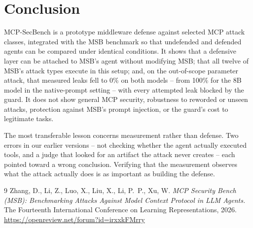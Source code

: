 \documentclass[11pt]{article}
\begin{document}
\section{Conclusion}

MCP-SecBench is a prototype middleware defense against selected MCP attack
classes, integrated with the MSB benchmark so that undefended and defended
agents can be compared under identical conditions. It shows that a defensive
layer can be attached to MSB's agent without modifying MSB; that all twelve
of MSB's attack types execute in this setup; and, on the out-of-scope
parameter attack, that measured leaks fell to 0\% on both models -- from
100\% for the 8B model in the native-prompt setting -- with every attempted
leak blocked by the guard. It does not show general MCP security, robustness to
reworded or unseen attacks, protection against MSB's prompt injection, or the
guard's cost to legitimate tasks.

The most transferable lesson concerns measurement rather than defense. Two
errors in our earlier versions -- not checking whether the agent actually
executed tools, and a judge that looked for an artifact the attack never
creates -- each pointed toward a wrong conclusion. Verifying that the
measurement observes what the attack actually does is as important as
building the defense.

\begin{thebibliography}{9}
Zhang, D., Li, Z., Luo, X., Liu, X., Li, P.\ P., Xu, W.
\emph{MCP Security Bench (MSB): Benchmarking Attacks Against Model Context
Protocol in LLM Agents.} The Fourteenth International Conference on Learning
Representations, 2026. \url{https://openreview.net/forum?id=irxxkFMrry}
\end{thebibliography}
\end{document}
